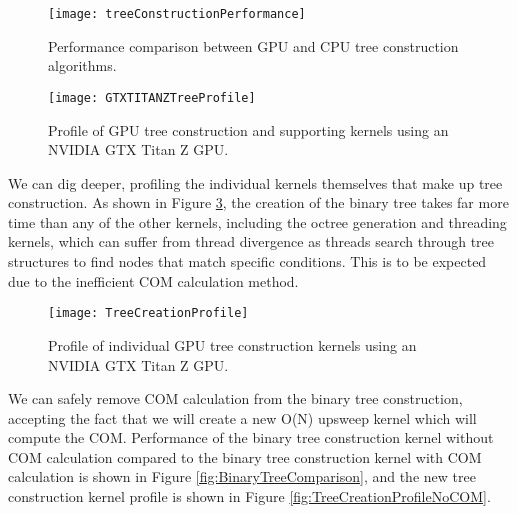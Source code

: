 \documentclass{thesis}
\begin{document}
\begin{figure}[h]
    \caption{Performance comparison between GPU and CPU tree construction algorithms.}
    \label{fig:treeConstructionPerformance}
    \centering
    \texttt{[image: treeConstructionPerformance]}
\end{figure}
\begin{figure}[h]
    \caption{Profile of GPU tree construction and supporting kernels using an NVIDIA GTX Titan Z GPU.}
    \label{fig:treeConstructionProfiling}
    \centering
    \texttt{[image: GTXTITANZTreeProfile]}
\end{figure}
We can dig deeper, profiling the individual kernels themselves that make up tree construction. As shown in Figure \ref{fig:TreeCreationProfile}, the creation of the binary tree takes far more time than any of the other kernels, including the octree generation and threading kernels, which can suffer from thread divergence as threads search through tree structures to find nodes that match specific conditions. This is to be expected due to the inefficient COM calculation method.
\begin{figure}[h]
    \caption{Profile of individual GPU tree construction kernels using an NVIDIA GTX Titan Z GPU.}
    \label{fig:TreeCreationProfile}
    \centering
    \texttt{[image: TreeCreationProfile]}
\end{figure}
We can safely remove COM calculation from the binary tree construction, accepting the fact that we will create a new O(N) upsweep kernel which will compute the COM. Performance of the binary tree construction kernel without COM calculation compared to the binary tree construction kernel with COM calculation is shown in Figure \ref{fig:BinaryTreeComparison}, and the new tree construction kernel profile is shown in Figure \ref{fig:TreeCreationProfileNoCOM}.
\end{document}
